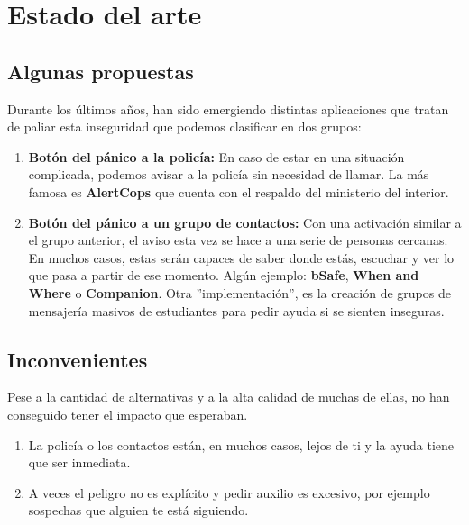 \chapter{Estado del arte}
\section{Algunas propuestas}
Durante los últimos años, han sido emergiendo distintas aplicaciones que tratan de paliar esta inseguridad que podemos clasificar en dos grupos:
\begin{enumerate}
\item \textbf{Botón del pánico a la policía:} En caso de estar en una situación complicada, podemos avisar a la policía sin necesidad de llamar. La más famosa es \textbf{AlertCops} que cuenta con el respaldo del ministerio del interior.
\item \textbf{Botón del pánico a un grupo de contactos:} Con una activación similar a el grupo anterior, el aviso esta vez se hace a una serie de personas cercanas. En muchos casos, estas serán capaces de saber donde estás, escuchar y ver lo que pasa a partir de ese momento. Algún ejemplo: \textbf{bSafe}, \textbf{When and Where} o \textbf{Companion}.
Otra ''implementación'', es la creación de grupos de mensajería masivos de estudiantes para pedir ayuda si se sienten inseguras.
\end{enumerate}

\section{Inconvenientes}
Pese a la cantidad de alternativas y a la alta calidad de muchas de ellas, no han conseguido tener el impacto que esperaban.
\begin{enumerate}
  \item La policía o los contactos están, en muchos casos, lejos de ti y la ayuda tiene que ser inmediata.
  \item A veces el peligro no es explícito y pedir auxilio es excesivo, por ejemplo sospechas que alguien te está siguiendo.
\end{enumerate}

